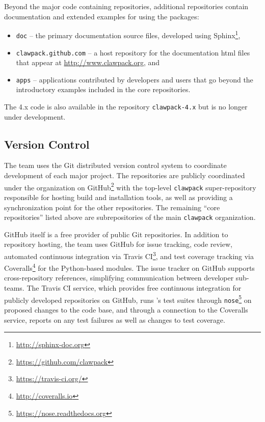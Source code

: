 Beyond the major code containing repositories, additional repositories contain
documentation and extended examples for using the packages:
\begin{itemize}
    \item \texttt{doc} -- the primary documentation source files,
    developed using Sphinx\footnote{\url{http://sphinx-doc.org}},
    \item \texttt{clawpack.github.com} -- a host repository for the
    documentation html files
    that appear at \url{http://www.clawpack.org}, and
    \item \texttt{apps} -- applications contributed by developers and
    users that go beyond the introductory examples included in the core
    repositories.
\end{itemize}
The \clawpack 4.x code is also available in the repository \texttt{clawpack-4.x}
but is no longer under development.


\subsection{Version Control}

The \clawpack team uses the Git distributed version control system
to coordinate development of each major project.  The repositories are
publicly coordinated under the \clawpack organization on
GitHub\footnote{\url{https://github.com/clawpack}} with the
top-level \texttt{clawpack} super-repository responsible for hosting
build and installation tools, as well as providing a synchronization
point for the other repositories.  The remaining ``core \clawpack repositories''
listed above are subrepositories of the main \texttt{clawpack} organization.

GitHub itself is a free provider of public Git repositories.  In addition to
repository hosting, the \clawpack team uses GitHub for issue tracking,
code review, automated continuous integration via Travis CI\footnote{\url{https://travis-ci.org/}},
and test coverage tracking via Coveralls\footnote{\url{http://coveralls.io}}
for the Python-based modules.  The issue tracker on
GitHub supports cross-repository references,
simplifying communication between \clawpack developer sub-teams.  The
Travis CI service, which provides free continuous integration for
publicly developed repositories on GitHub, runs \clawpack's test
suites through \texttt{nose}\footnote{\url{https://nose.readthedocs.org}}
on proposed changes
to the code base, and through a connection to the Coveralls service,
reports on any test failures as well as changes to test coverage.

